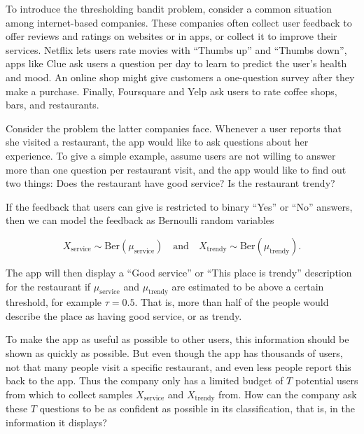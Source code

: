 \documentclass[11pt,]{article}
\begin{document}
To introduce the thresholding bandit problem, consider a common
situation among internet-based companies. These companies often collect
user feedback to offer reviews and ratings on websites or in apps, or
collect it to improve their services. Netflix lets users rate movies
with ``Thumbs up'' and ``Thumbs down'', apps like Clue ask users a
question per day to learn to predict the user's health and mood. An
online shop might give customers a one-question survey after they make a
purchase. Finally, Foursquare and Yelp ask users to rate coffee shops,
bars, and restaurants.

Consider the problem the latter companies face. Whenever a user reports
that she visited a restaurant, the app would like to ask questions about
her experience. To give a simple example, assume users are not willing
to answer more than one question per restaurant visit, and the app would
like to find out two things: Does the restaurant have good service? Is
the restaurant trendy?

If the feedback that users can give is restricted to binary ``Yes'' or
``No'' answers, then we can model the feedback as Bernoulli random
variables

\[
X_{\text{service}} \sim \text{Ber}(\mu_{\text{service}}) \quad \text{and} \quad X_{\text{trendy}} \sim \text{Ber}(\mu_{\text{trendy}}).
\]

The app will then display a ``Good service'' or ``This place is trendy''
description for the restaurant if \(\mu_{\text{service}}\) and
\(\mu_{\text{trendy}}\) are estimated to be above a certain threshold,
for example \(\tau = 0.5\). That is, more than half of the people would
describe the place as having good service, or as trendy.

To make the app as useful as possible to other users, this information
should be shown as quickly as possible. But even though the app has
thousands of users, not that many people visit a specific restaurant,
and even less people report this back to the app. Thus the company only
has a limited budget of \(T\) potential users from which to collect
samples \(X_{\text{service}}\) and \(X_{\text{trendy}}\) from. How can
the company ask these \(T\) questions to be as confident as possible in
its classification, that is, in the information it displays?
\end{document}
